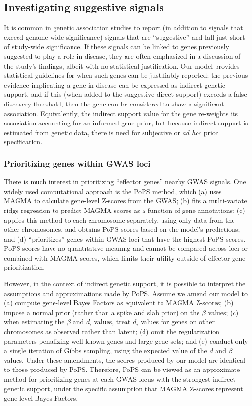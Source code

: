 \documentclass[11pt]{article}
\begin{document}
\subsection{Investigating suggestive signals}
It is common in genetic association studies to report (in addition to
signals that exceed genome-wide significance) signals that are
``suggestive'' and fall just short of study-wide significance. If
these signals can be linked to genes previously suggested to play a
role in disease, they are often emphasized in a discussion of the
study's findings, albeit with no statistical justification. Our model
provides statistical guidelines for when such genes can be justifiably
reported: the previous evidence implicating a gene in disease can be
expressed as indirect genetic support, and if this (when added to the
suggestive direct support) exceeds a false discovery threshold, then
the gene can be considered to show a significant
association. Equivalently, the indirect support value for the gene re-weights its
association accounting for an informed gene prior, but because
indirect support is estimated from genetic data, there is need for
subjective or \textit{ad hoc} prior specification.

\subsubsection{Prioritizing genes within GWAS loci}
There is much interest in prioritizing ``effector genes'' nearby GWAS
signals\cite{costanzo}. One widely used computational approach is the
PoPS method\cite{}, which (a) uses MAGMA\cite{} to calculate
gene-level Z-scores from the GWAS; (b) fits a multi-variate ridge
regression to predict MAGMA scores as a function of gene annotations;
(c) applies this method to each chromosome separately, using only data
from the other chromosomes, and obtains PoPS scores based on the
model's predictions; and (d) ``prioritizes'' genes
within GWAS loci that have the highest PoPS scores. PoPS scores have
no quantitative meaning and cannot be compared across loci or combined
with MAGMA scores, which limits their utility outside of effector gene
prioritization.

However, in the context of indirect genetic support, it is possible to
interpret the assumptions and approximations made by PoPS. Assume we amend
our model to (a) compute gene-level Bayes Factors as equivalent to
MAGMA Z-scores; (b) impose a normal prior (rather than a spike and
slab prior) on the $\beta$ values; (c) when estimating the $\beta$
and $d_i$ values, treat $d_i$ values for genes on other chromosomes as
observed rather than latent; (d) omit the regularization parameters
penalizing well-known genes and large gene sets; and (e) conduct only a single iteration
of Gibbs sampling, using the expected value of the $d$ and $\beta$
values. Under these amendments, the scores produced by our model are
identical to those produced by PoPS. Therefore, PoPS can be
viewed as an approximate method for prioritizing genes at each GWAS locus with the strongest indirect
genetic support, under the specific assumption that MAGMA Z-scores
represent gene-level Bayes Factors.
\end{document}
